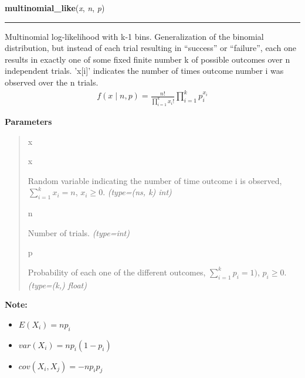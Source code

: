     \begin{boxedminipage}{\textwidth}

    \raggedright \textbf{multinomial\_like}(\textit{x}, \textit{n}, \textit{p})

    \vspace{-1.5ex}

    \rule{\textwidth}{0.5\fboxrule}

Multinomial log-likelihood with k-1 bins. Generalization of the binomial
distribution, but instead of each trial resulting in ``success'' or
``failure'', each one results in exactly one of some fixed finite number k
of possible outcomes over n independent trials. 'x{[}i{]}' indicates the number
of times outcome number i was observed over the n trials.
\begin{equation*}\begin{split}f(x \mid n, p) = \frac{n!}{\prod_{i=1}^k x_i!} \prod_{i=1}^k p_i^{x_i}\end{split}\end{equation*}    \vspace{1ex}

      \textbf{Parameters}
      \begin{quote}
        \begin{Ventry}{x}

          \item[x]


Random variable indicating the number of time outcome i is observed,
$\sum_{i=1}^k x_i=n$, $x_i \ge 0$.
            \textit{(type=(ns, k) int)}

          \item[n]


Number of trials.
            \textit{(type=int)}

          \item[p]


Probability of each one of the different outcomes,
$\sum_{i=1}^k p_i = 1)$, $p_i \ge 0$.
            \textit{(type=(k,) float)}

        \end{Ventry}

      \end{quote}

    \vspace{1ex}

\textbf{Note:} \begin{itemize}
\item {} 
$E(X_i)=n p_i$

\item {} 
$var(X_i)=n p_i(1-p_i)$

\item {} 
$cov(X_i,X_j) = -n p_i p_j$

\end{itemize}


    \end{boxedminipage}

